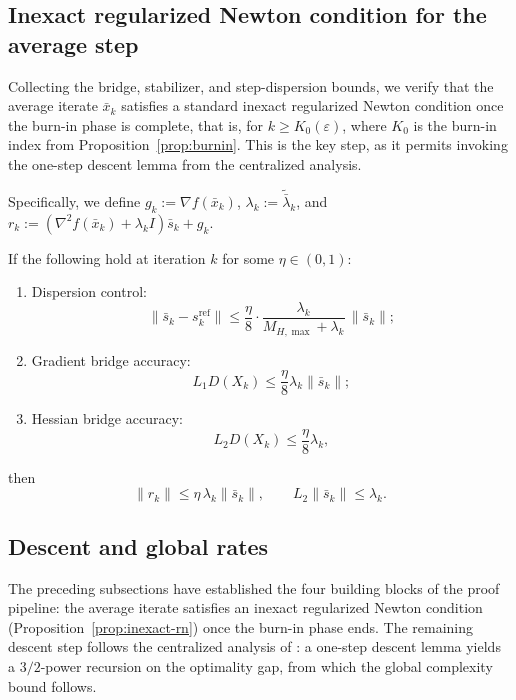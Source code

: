 \documentclass[review,onefignum,onetabnum]{siamart171218}
\begin{document}
	\subsection{Inexact regularized Newton condition for the average step}\label{ssec:inexact}
	Collecting the bridge, stabilizer, and step-dispersion bounds, we
	verify that the average iterate $\bar x_k$ satisfies a standard
	inexact regularized Newton condition once the burn-in phase
	is complete, that is, for $k\ge K_0(\varepsilon)$, where $K_0$ is the
	burn-in index from Proposition~\ref{prop:burnin}.
	This is the key step, as it permits invoking the one-step descent
	lemma from the centralized analysis.
	
	Specifically, we define $g_k:=\nabla f(\bar x_k)$, $\lambda_k:=\tilde{\bar\lambda}_k$, and $r_k:=(\nabla^2 f(\bar x_k)+\lambda_k I)\bar s_k+g_k$.
	
	\begin{proposition}\label{prop:inexact-rn}
		If the following hold at iteration $k$ for some $\eta\in(0,1)$:
		\begin{enumerate}[leftmargin=1.2em,itemsep=2pt]
			\item Dispersion control:
			\[
			\|\bar s_k-s_k^{\mathrm{ref}}\|\le \frac{\eta}{8}\cdot \frac{\lambda_k}{M_{H,\max}+\lambda_k}\,\|\bar s_k\|;
			\]
			\item Gradient bridge accuracy:
			\[
			L_1D(X_k)\le \frac{\eta}{8}\lambda_k\|\bar s_k\|;
			\]
		\item Hessian bridge accuracy:
		\[
		L_2D(X_k)\le \frac{\eta}{8}\lambda_k,
		\]
	\end{enumerate}
	then
		\[
		\|r_k\|\le \eta\,\lambda_k\|\bar s_k\|,
		\qquad
		L_2\|\bar s_k\|\le \lambda_k.
		\]
	\end{proposition}
	
	\subsection{Descent and global rates}\label{ssec:descent}
	The preceding subsections have established the four building blocks
	of the proof pipeline: the average
	iterate satisfies an inexact regularized Newton condition
	(Proposition~\ref{prop:inexact-rn}) once the burn-in phase ends.
	The remaining descent step follows the centralized analysis of
	\citet{mishchenko2023rn}: a one-step descent lemma yields a
	$3/2$-power recursion on the optimality gap, from which the global
	complexity bound follows.
	
\end{document}
